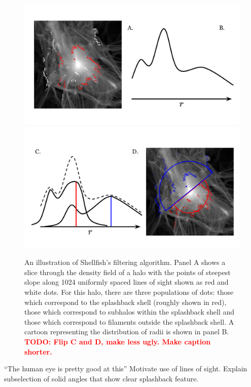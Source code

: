 \documentclass[numberedappendix,apj]{emulateapj}
\begin{document}
\begin{figure}
   \centering
   \includegraphics[width=\columnwidth]{shell_finder_algo_a.pdf} \\
   \includegraphics[width=\columnwidth]{shell_finder_algo_b.pdf}
   \caption{An illustration of Shellfish's filtering algorithm. Panel A shows
      a slice through the density field of a halo with the points of steepest
      slope along 1024 uniformly spaced lines of sight shown as red and white
      dots. For this halo, there are three populations of dots: those which
      correspond to the splashback shell (roughly shown in red), those which
      correspond to subhalos within the splashback shell and those which
      correspond to filaments outside the splashback shell. A cartoon
      representing the distribution of radii is shown in panel B.
      \textcolor{red}{\textbf{TODO: Flip C and D, make less ugly. Make caption
      shorter.}}
   }
   \label{fig:shell_finder_algo}
\end{figure}

``The human eye is pretty good at this''
Motivate use of lines of sight. Explain subselection of solid angles that show
clear splashback feature.
\end{document}
